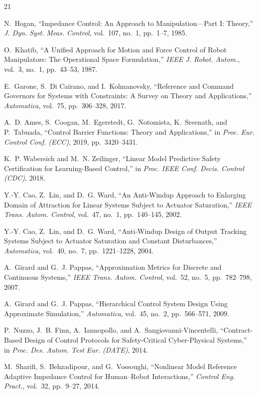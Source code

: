 \documentclass[journal]{IEEEtran}
\begin{document}
\begin{thebibliography}{21}

 N.~Hogan, ``Impedance Control: An Approach to Manipulation---Part I: Theory,'' \emph{J. Dyn. Syst. Meas. Control}, vol.~107, no.~1, pp.~1--7, 1985.

 O.~Khatib, ``A Unified Approach for Motion and Force Control of Robot Manipulators: The Operational Space Formulation,'' \emph{IEEE J. Robot. Autom.}, vol.~3, no.~1, pp.~43--53, 1987.

 E.~Garone, S.~Di Cairano, and I.~Kolmanovsky, ``Reference and Command Governors for Systems with Constraints: A Survey on Theory and Applications,'' \emph{Automatica}, vol.~75, pp.~306--328, 2017.

 A.~D. Ames, S.~Coogan, M.~Egerstedt, G.~Notomista, K.~Sreenath, and P.~Tabuada, ``Control Barrier Functions: Theory and Applications,'' in \emph{Proc. Eur. Control Conf. (ECC)}, 2019, pp.~3420--3431.

 K.~P. Wabersich and M.~N. Zeilinger, ``Linear Model Predictive Safety Certification for Learning-Based Control,'' in \emph{Proc. IEEE Conf. Decis. Control (CDC)}, 2018.

 Y.-Y. Cao, Z.~Lin, and D.~G. Ward, ``An Anti-Windup Approach to Enlarging Domain of Attraction for Linear Systems Subject to Actuator Saturation,'' \emph{IEEE Trans. Autom. Control}, vol.~47, no.~1, pp.~140--145, 2002.

 Y.-Y. Cao, Z.~Lin, and D.~G. Ward, ``Anti-Windup Design of Output Tracking Systems Subject to Actuator Saturation and Constant Disturbances,'' \emph{Automatica}, vol.~40, no.~7, pp.~1221--1228, 2004.

 A.~Girard and G.~J. Pappas, ``Approximation Metrics for Discrete and Continuous Systems,'' \emph{IEEE Trans. Autom. Control}, vol.~52, no.~5, pp.~782--798, 2007.

 A.~Girard and G.~J. Pappas, ``Hierarchical Control System Design Using Approximate Simulation,'' \emph{Automatica}, vol.~45, no.~2, pp.~566--571, 2009.

 P.~Nuzzo, J.~B. Finn, A.~Iannopollo, and A.~Sangiovanni-Vincentelli, ``Contract-Based Design of Control Protocols for Safety-Critical Cyber-Physical Systems,'' in \emph{Proc. Des. Autom. Test Eur. (DATE)}, 2014.

 M.~Sharifi, S.~Behzadipour, and G.~Vossoughi, ``Nonlinear Model Reference Adaptive Impedance Control for Human--Robot Interactions,'' \emph{Control Eng. Pract.}, vol.~32, pp.~9--27, 2014.


\end{thebibliography}
\end{document}
